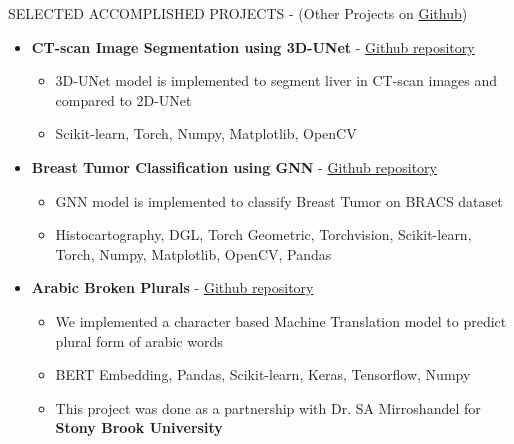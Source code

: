 \documentclass[]{CV}
\begin{document}
\vspace{-4mm}
\begin{section}{SELECTED ACCOMPLISHED PROJECTS { - (Other Projects on \href{https://github.com/amirkasaei}{Github})}}
\begin{itemize}


\item \textbf{CT-scan Image Segmentation using 3D-UNet} - \href{https://github.com/amirkasaei/CT-scan-Image-Segmentation-using-3D-UNet}{Github repository}
   \begin{itemize}
        \item 3D-UNet model is implemented to segment liver in CT-scan images and compared to 2D-UNet
        \item Scikit-learn, Torch, Numpy, Matplotlib, OpenCV
    \end{itemize}

\item \textbf{Breast Tumor Classification using GNN} - \href{https://github.com/amirkasaei/Breast-Tumor-Classification-using-GNN}{Github repository}
   \begin{itemize}
        \item GNN model is implemented  to classify Breast Tumor on BRACS dataset
        \item Histocartography, DGL, Torch Geometric, Torchvision, Scikit-learn, Torch, Numpy, Matplotlib, OpenCV, Pandas
    \end{itemize}
    
\item \textbf{Arabic Broken Plurals} - \href{https://github.com/amirkasaei/Arabic-Broken-Plurals}{Github repository}
   \begin{itemize}
        \item We implemented a character based Machine Translation model to predict plural form of arabic words
        \item BERT Embedding, Pandas, Scikit-learn, Keras, Tensorflow, Numpy
        \item This project was done as a partnership with Dr. SA Mirroshandel for \textbf{Stony Brook University}
    \end{itemize}
    

\end{itemize}
\end{section}
\end{document}
